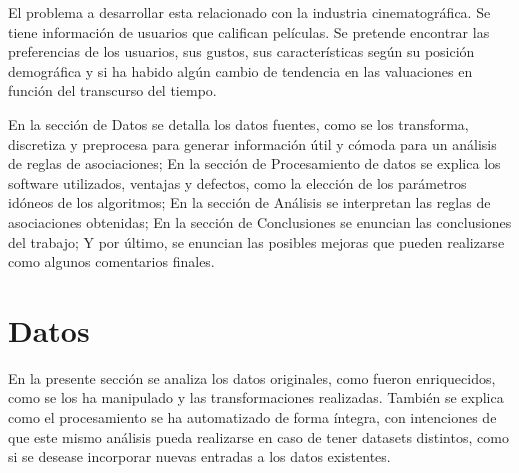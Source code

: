 \documentclass[journal]{IEEEtran}
\begin{document}
El problema a desarrollar esta relacionado con la industria cinematográfica.
Se tiene información de usuarios que califican películas. Se pretende encontrar
las preferencias de los usuarios, sus gustos, sus características según su
posición demográfica y si ha habido algún cambio de tendencia en las valuaciones
en función del transcurso del tiempo.

En la sección de Datos se detalla los datos fuentes, como se los transforma,
discretiza y preprocesa para generar información útil y cómoda para un análisis
de reglas de asociaciones; En la sección de Procesamiento de datos se 
explica los software utilizados, ventajas y defectos, como la elección de los
parámetros idóneos de los algoritmos; En la sección de Análisis se interpretan
las reglas de asociaciones obtenidas; En la sección de Conclusiones se enuncian
las conclusiones del trabajo; Y por último, se enuncian las posibles mejoras
que pueden realizarse como algunos comentarios finales.



\section{Datos}
En la presente sección se analiza los datos originales, como fueron enriquecidos,
como se los ha manipulado y las transformaciones realizadas. También se explica como 
el procesamiento se ha automatizado 
de forma íntegra, con intenciones de que este mismo análisis 
pueda realizarse en caso de tener datasets distintos, como si se desease incorporar
nuevas entradas a los datos existentes.
\end{document}
